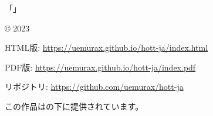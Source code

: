 \documentclass[b5paper]{ltjsbook}
\title{\myTitle}
\author{\myAuthor}
\begin{document}
\frontmatter

\maketitle                      %

\pagebreak
\hspace{0pt}
\vfill
\noindent 「\myTitle」
\par\noindent \copyright{} 2023 \myAuthor
\par\vspace{1em}
\noindent HTML版: \url{https://uemurax.github.io/hott-ja/index.html}
\par\noindent PDF版: \url{https://uemurax.github.io/hott-ja/index.pdf}
\par\noindent リポジトリ: \url{https://github.com/uemurax/hott-ja}
\par\vspace{1em}
\noindent この作品はの下に提供されています。
\vfill
\hspace{0pt}
\thispagestyle{empty}
\pagebreak


\tableofcontents                %
\listoffigures

\mainmatter



\backmatter





\end{document}
